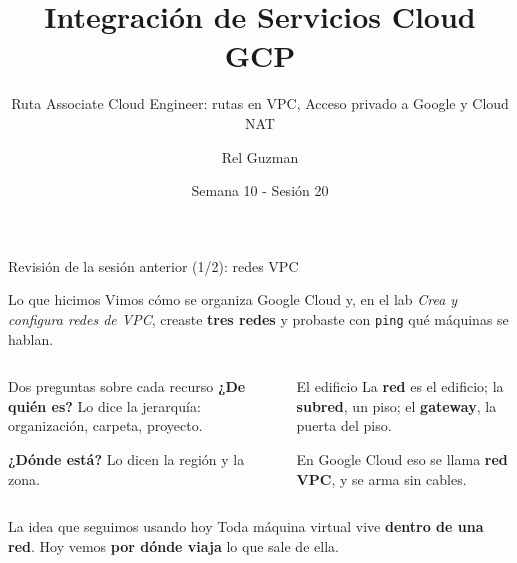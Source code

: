 \documentclass[aspectratio=169,10pt,c]{beamer}
\title{Integración de Servicios Cloud GCP}
\subtitle{Ruta Associate Cloud Engineer: rutas en VPC, Acceso privado a Google y Cloud NAT}
\date{Semana 10 - Sesión 20}
\author{Rel Guzman}
\begin{document}
{\maketitle}

\begin{frame}{Revisión de la sesión anterior (1/2): redes VPC}
\begin{block}{Lo que hicimos}
\small Vimos cómo se organiza Google Cloud y, en el lab \emph{Crea y configura redes de VPC}, creaste \textbf{tres redes} y probaste con \texttt{ping} qué máquinas se hablan.
\end{block}
\begin{columns}[T,onlytextwidth]
\begin{exampleblock}{Dos preguntas sobre cada recurso}
\small \textbf{¿De quién es?} Lo dice la jerarquía: organización, carpeta, proyecto.\par\smallskip
\textbf{¿Dónde está?} Lo dicen la región y la zona.
\end{exampleblock}
\begin{exampleblock}{El edificio}
\small La \textbf{red} es el edificio; la \textbf{subred}, un piso; el \textbf{gateway}, la puerta del piso.\par\smallskip
En Google Cloud eso se llama \textbf{red VPC}, y se arma sin cables.
\end{exampleblock}
\end{columns}
\par\vspace{1mm}
\begin{alertblock}{La idea que seguimos usando hoy}
\small Toda máquina virtual vive \textbf{dentro de una red}. Hoy vemos \textbf{por dónde viaja} lo que sale de ella.
\end{alertblock}
\end{frame}
\end{document}
